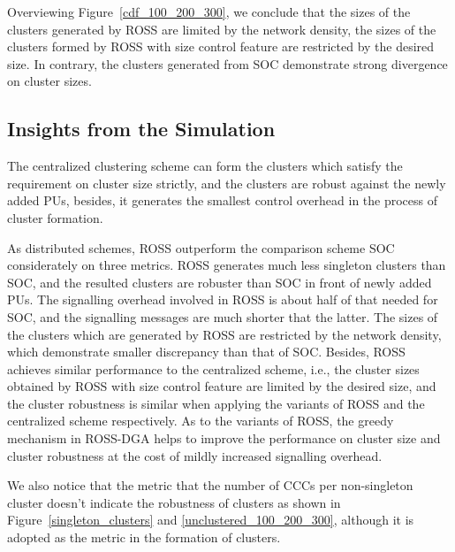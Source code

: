 \documentclass[10pt,journal,compsoc]{IEEEtran}
\theoremstyle{mytheoremstyle}
\theoremstyle{mytheoremstyle}
\theoremstyle{mytheoremstyle}
\newcommand{\ie}{i.e., }
\begin{document}
Overviewing Figure~\ref{cdf_100_200_300}, we conclude that the sizes of the clusters generated by ROSS are limited by the network density, the sizes of the clusters formed by ROSS with size control feature are restricted by the desired size.
In contrary, the clusters generated from SOC demonstrate strong divergence on cluster sizes.


\subsection{Insights from the Simulation}
The centralized clustering scheme can form the clusters which satisfy the requirement on cluster size strictly, and the clusters are robust against the newly added PUs, besides, it generates the smallest control overhead in the process of cluster formation.

As distributed schemes, ROSS outperform the comparison scheme SOC considerately on three metrics.
ROSS generates much less singleton clusters than SOC, and the resulted clusters are robuster than SOC in front of newly added PUs.
The signalling overhead involved in ROSS is about half of that needed for SOC, and the signalling messages are much shorter that the latter.
The sizes of the clusters which are generated by ROSS are restricted by the network density, which demonstrate smaller discrepancy than that of SOC.
%
Besides, ROSS achieves similar performance to the centralized scheme, \ie the cluster sizes obtained by ROSS with size control feature are limited by the desired size, and the cluster robustness is similar when applying the variants of ROSS and the centralized scheme respectively.
As to the variants of ROSS, the greedy mechanism in ROSS-DGA helps to improve the performance on cluster size and cluster robustness at the cost of mildly increased signalling overhead.

We also notice that the metric that the number of CCCs per non-singleton cluster doesn't indicate the robustness of clusters as shown in Figure~\ref{singleton_clusters} and \ref{unclustered_100_200_300}, although it is adopted as the metric in the formation of clusters.
\end{document}
